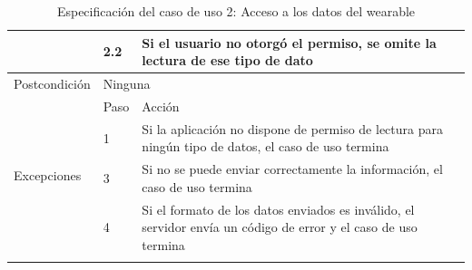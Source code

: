 \begin{table}[h]
\begin{tabularx}{\textwidth}{|l|l|X|}
            \cline{2-3} & 2.2 & Si el usuario no otorgó el permiso, se omite la lectura de ese tipo de dato \\
            \hline
            Postcondición & \multicolumn{2}{|X|}{Ninguna} \\
            \hline
            \multirow{4}{*}{Excepciones} & Paso & Acción \\
            \cline{2-3} & 1 & Si la aplicación no dispone de permiso de lectura para ningún tipo de datos, el caso de uso termina \\
            \cline{2-3} & 3 & Si no se puede enviar correctamente la información, el caso de uso termina \\
            \cline{2-3} & 4 & Si el formato de los datos enviados es inválido, el servidor envía un código de error y el caso de uso termina \\
            \hline
            \caption{Especificación del caso de uso 2: Acceso a los datos del \gls{wearable}}
            \label{tabla:casos_uso:acceso_datos}
        \end{tabularx}
    \end{table}

